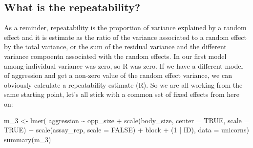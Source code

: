 \documentclass[
  12pt,
]{book}
\newenvironment{Shaded}{\begin{snugshade}}{\end{snugshade}}
\newcommand{\AttributeTok}[1]{\textcolor[rgb]{0.77,0.63,0.00}{#1}}
\newcommand{\ConstantTok}[1]{\textcolor[rgb]{0.00,0.00,0.00}{#1}}
\newcommand{\DecValTok}[1]{\textcolor[rgb]{0.00,0.00,0.81}{#1}}
\newcommand{\FunctionTok}[1]{\textcolor[rgb]{0.00,0.00,0.00}{#1}}
\newcommand{\NormalTok}[1]{#1}
\newcommand{\OtherTok}[1]{\textcolor[rgb]{0.56,0.35,0.01}{#1}}
\newcommand{\SpecialCharTok}[1]{\textcolor[rgb]{0.00,0.00,0.00}{#1}}
\begin{document}
\hypertarget{what-is-the-repeatability}{%
\subsection{What is the repeatability?}\label{what-is-the-repeatability}}

As a reminder, repeatability is the proportion of variance explained by a random effect and it is estimate as the ratio of the variance associated to a random effect by the total variance, or the sum of the residual variance and the different variance compoentn associated with the random effects.
In our first model among-individual variance was zero, so R was zero. If we have a different model of aggression and get a non-zero value of the random effect variance, we can obviously calculate a repeatability estimate (R). So we are all working from the same starting point, let's all stick with a common set of fixed effects from here on:

\begin{Shaded}
\begin{Highlighting}[]
\NormalTok{m\_3 }\OtherTok{\textless{}{-}} \FunctionTok{lmer}\NormalTok{(}
\NormalTok{  aggression }\SpecialCharTok{\textasciitilde{}}\NormalTok{ opp\_size }\SpecialCharTok{+} \FunctionTok{scale}\NormalTok{(body\_size, }\AttributeTok{center =} \ConstantTok{TRUE}\NormalTok{, }\AttributeTok{scale =} \ConstantTok{TRUE}\NormalTok{)}
              \SpecialCharTok{+} \FunctionTok{scale}\NormalTok{(assay\_rep, }\AttributeTok{scale =} \ConstantTok{FALSE}\NormalTok{) }\SpecialCharTok{+}\NormalTok{ block}
              \SpecialCharTok{+}\NormalTok{ (}\DecValTok{1} \SpecialCharTok{|}\NormalTok{ ID),}
  \AttributeTok{data =}\NormalTok{ unicorns)}
\FunctionTok{summary}\NormalTok{(m\_3)}
\end{Highlighting}
\end{Shaded}
\end{document}
